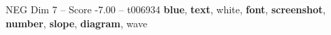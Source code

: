 \begin{textsample}{NEG Dim 7 – Score -7.00 – t006934}  \label{ex:f7_neg_029}
\textbf{blue}, \textbf{text}, white, \textbf{font}, \textbf{screenshot}, \textbf{number}, \textbf{slope}, \textbf{diagram}, wave

\end{textsample}
